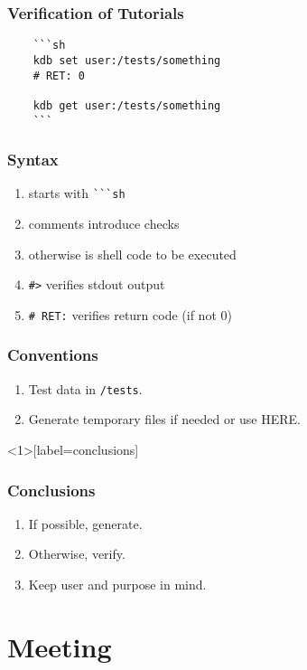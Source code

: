 \begin{frame}[fragile]
	\frametitle{Verification of Tutorials}

	\begin{lstlisting}
	```sh
	kdb set user:/tests/something
	# RET: 0

	kdb get user:/tests/something
	```
\end{lstlisting}
\end{frame}

\begin{frame}[fragile]
	\frametitle{Syntax}

	\begin{enumerate}[<+-| alert@+>]
	\item starts with \verb+```sh+
	\item comments introduce checks
	\item otherwise is shell code to be executed
	\item \verb+#>+ verifies stdout output
	\item \verb+# RET:+ verifies return code (if not 0)
	\end{enumerate}
\end{frame}

\begin{frame}[fragile]
	\frametitle{Conventions}

	\begin{enumerate}[<+-| alert@+>]
	\item Test data in \verb+/tests+.
	\item Generate temporary files if needed or use HERE.
	\end{enumerate}
\end{frame}

\begin{frame}<1>[label=conclusions]
	\frametitle{Conclusions}

	\begin{enumerate}[<+-| alert@+>]
	\item If possible, generate.
	\item Otherwise, verify.
	\item Keep user and purpose in mind.
	\end{enumerate}
\end{frame}

\section{Meeting}


